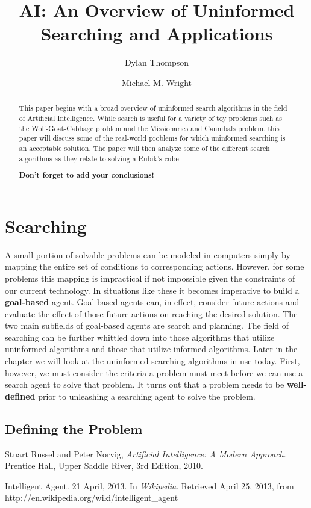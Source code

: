 \documentclass[a4paper,11pt]{report}
\title{AI: An Overview of Uninformed Searching and Applications}
\author{Dylan Thompson \and Michael M. Wright}
\begin{document}
\maketitle
\tableofcontents

\begin{abstract}
This paper begins with a broad overview of uninformed search algorithms in the 
field of Artificial Intelligence.  While search is useful for a variety of toy 
problems such as the Wolf-Goat-Cabbage problem and the Missionaries and
Cannibals problem, this paper will discuss some of the real-world problems
for which uninformed searching is an acceptable solution.  The paper will then 
analyze some of the different search algorithms as they relate to solving a 
Rubik's cube.

\textbf{Don't forget to add your conclusions!}

\end{abstract}

\chapter{Searching}
A small portion of solvable problems can be modeled in computers simply by
mapping the entire set of conditions to corresponding actions.  However, for
some problems this mapping is impractical if not impossible given the
constraints of our current technology.  In situations like these it becomes
imperative to build a \textbf{goal-based} agent.  Goal-based agents can, in
effect, consider future actions and evaluate the effect of those future
actions on reaching the desired solution.\cite[p.~64]{norvig}  The two main
subfields of goal-based agents are search and planning.\cite{wikiAgent} The
field of searching can be further whittled down into those algorithms that
utilize uninformed algorithms and those that utilize informed algorithms.
Later in the chapter we will look at the uninformed searching algorithms in
use today.  First, however, we must consider the criteria a problem must meet
before we can use a search agent to solve that problem.  It turns out that a
problem needs to be \textbf{well-defined} prior to unleashing a searching
agent to solve the problem.

\section{Defining the Problem}


\begin{thebibliography}{9}

    Stuart Russel and Peter Norvig,
    \textit{Artificial Intelligence: A Modern Approach}.
    Prentice Hall, Upper Saddle River,
    3rd Edition,
    2010.

    Intelligent Agent. 21 April, 2013.  
    In \textit{Wikipedia}.  Retrieved April 25, 2013,
    from http://en.wikipedia.org/wiki/intelligent\_agent

\end{thebibliography}
\end{document}

